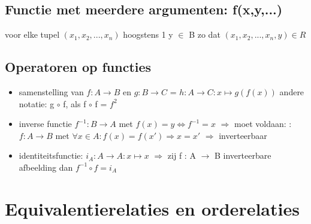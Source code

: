 \documentclass{article}
\begin{document}
\subsection{Functie met meerdere argumenten: f(x,y,...)}
voor elke tupel $(x_{1},x_{2},...,x_{n})$ hoogstens 1 y $\in$ B zo dat $(x_{1},x_{2},...,x_{n},y) \in R$

\subsection{Operatoren op functies}
\begin{itemize}
    \item samenstelling van $f: A \rightarrow B$ en $g: B \rightarrow C$ = $h: A \rightarrow C : x \mapsto g(f(x))$ \newline andere notatie: g $\circ$ f, als f $\circ$ f = $f^2$
    \item inverse functie $f^{-1}: B \rightarrow A$ met $f(x) = y \iff f^{-1} = x$ 
    \newline $\Rightarrow$ moet voldaan: : $f: A \rightarrow B$ met $\forall x \in A: f(x) = f(x') \Rightarrow x=x'$ 
    \newline $\Rightarrow$ inverteerbaar
    \item identiteitsfunctie: $i_{A} : A \rightarrow A : x \mapsto x$ 
    \newline $\Rightarrow$ zij f : A $\rightarrow$ B inverteerbare afbeelding dan $f^{-1} \circ f = i_{A}$
\end{itemize}

\section{Equivalentierelaties en orderelaties}
\end{document}
